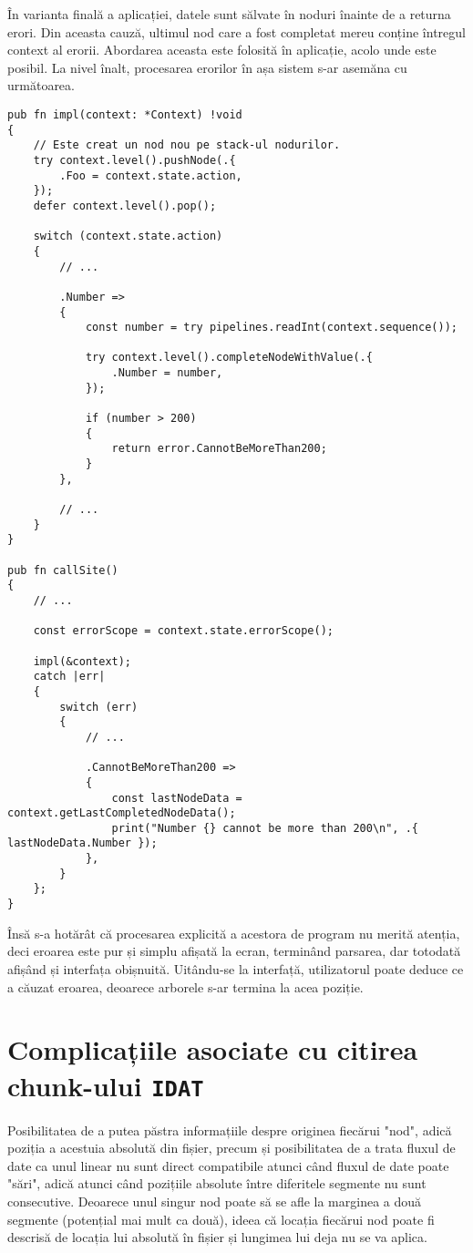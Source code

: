 \documentclass[a4paper,12pt]{report}
\begin{document}
În varianta finală a aplicației, datele sunt sălvate în noduri înainte de a returna erori.
Din aceasta cauză, ultimul nod care a fost completat mereu conține întregul context al erorii.
Abordarea aceasta este folosită în aplicație, acolo unde este posibil.
La nivel înalt, procesarea erorilor în așa sistem s-ar asemăna cu următoarea.

\begin{verbatim}
pub fn impl(context: *Context) !void
{
    // Este creat un nod nou pe stack-ul nodurilor.
    try context.level().pushNode(.{
        .Foo = context.state.action,
    });
    defer context.level().pop();

    switch (context.state.action)
    {
        // ...

        .Number =>
        {
            const number = try pipelines.readInt(context.sequence());

            try context.level().completeNodeWithValue(.{
                .Number = number,
            });

            if (number > 200)
            {
                return error.CannotBeMoreThan200;
            }
        },

        // ...
    }
}

pub fn callSite()
{
    // ... 

    const errorScope = context.state.errorScope();

    impl(&context);
    catch |err|
    {
        switch (err)
        {
            // ...

            .CannotBeMoreThan200 =>
            {
                const lastNodeData = context.getLastCompletedNodeData();
                print("Number {} cannot be more than 200\n", .{ lastNodeData.Number });
            },
        }
    };
}
\end{verbatim}

Însă s-a hotărât că procesarea explicită a acestora de program nu merită atenția,
deci eroarea este pur și simplu afișată la ecran, terminând parsarea, dar totodată afișând și interfața obișnuită.
Uitându-se la interfață, utilizatorul poate deduce ce a căuzat eroarea, deoarece arborele s-ar termina la acea poziție.

\section{Complicațiile asociate cu citirea chunk-ului \texttt{IDAT}}

Posibilitatea de a putea păstra informațiile despre originea fiecărui "nod",
adică poziția a acestuia absolută din fișier,
precum și posibilitatea de a trata fluxul de date ca unul linear nu sunt direct compatibile
atunci când fluxul de date poate "sări", adică atunci când pozițiile absolute
între diferitele segmente nu sunt consecutive.
Deoarece unul singur nod poate să se afle la marginea a două segmente (potențial mai mult ca două),
ideea că locația fiecărui nod poate fi descrisă de locația lui absolută în fișier și
lungimea lui deja nu se va aplica.
\end{document}

